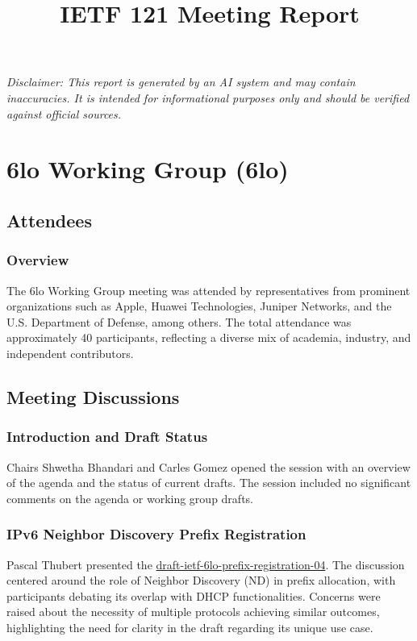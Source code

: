 \documentclass{article}
\title{\textbf{IETF 121 Meeting Report}}
\author{}
\date{}
\begin{document}
\maketitle

\noindent\textit{Disclaimer: This report is generated by an AI system and may contain inaccuracies. It is intended for informational purposes only and should be verified against official sources.}


\tableofcontents
\newpage

\section{6lo Working Group (6lo)}

\subsection{Attendees}
\subsubsection{Overview}
The 6lo Working Group meeting was attended by representatives from prominent organizations such as Apple, Huawei Technologies, Juniper Networks, and the U.S. Department of Defense, among others. The total attendance was approximately 40 participants, reflecting a diverse mix of academia, industry, and independent contributors.

\subsection{Meeting Discussions}

\subsubsection{Introduction and Draft Status}
Chairs Shwetha Bhandari and Carles Gomez opened the session with an overview of the agenda and the status of current drafts. The session included no significant comments on the agenda or working group drafts.

\subsubsection{IPv6 Neighbor Discovery Prefix Registration}
Pascal Thubert presented the \href{https://datatracker.ietf.org/doc/html/draft-ietf-6lo-prefix-registration-04}{draft-ietf-6lo-prefix-registration-04}. The discussion centered around the role of Neighbor Discovery (ND) in prefix allocation, with participants debating its overlap with DHCP functionalities. Concerns were raised about the necessity of multiple protocols achieving similar outcomes, highlighting the need for clarity in the draft regarding its unique use case.
\end{document}
